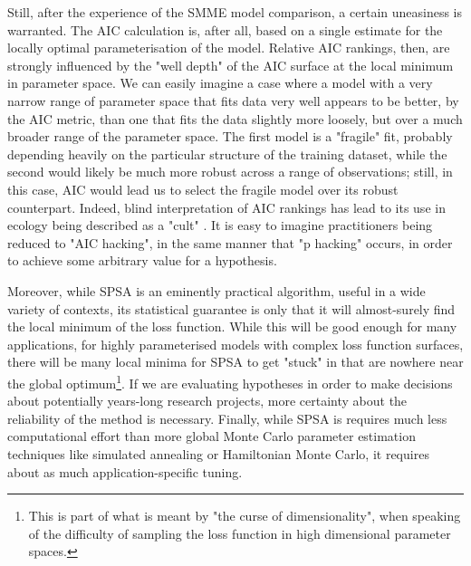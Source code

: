 Still, after the experience of the SMME model comparison, a certain uneasiness is warranted. The AIC calculation is, after all, based on a single estimate for the locally optimal parameterisation of the model. Relative AIC rankings, then, are strongly influenced by the "well depth" of the AIC surface at the local minimum in parameter space. We can easily imagine a case where a model with a very narrow range of parameter space that fits data very well appears to be better, by the AIC metric, than one that fits the data slightly more loosely, but over a much broader range of the parameter space. The first model is a "fragile" fit, probably depending heavily on the particular structure of the training dataset, while the second would likely be much more robust across a range of observations; still, in this case, AIC would lead us to select the fragile model over its robust counterpart. Indeed, blind interpretation of AIC rankings has lead to its use in ecology being described as a "cult" \cite{Brewer2020}. It is easy to imagine practitioners being reduced to "AIC hacking", in the same manner that "p hacking" occurs, in order to achieve some arbitrary value for a hypothesis.

Moreover, while SPSA is an eminently practical algorithm, useful in a wide variety of contexts, its statistical guarantee is only that it will almost-surely find the local minimum of the loss function. While this will be good enough for many applications, for highly parameterised models with complex loss function surfaces, there will be many local minima for SPSA to get "stuck" in that are nowhere near the global optimum\footnote{This is part of what is meant by "the curse of dimensionality", when speaking of the difficulty of sampling the loss function in high dimensional parameter spaces.}. If we are evaluating hypotheses in order to make decisions about potentially years-long research projects, more certainty about the reliability of the method is necessary. Finally, while SPSA is requires much less computational effort than more global Monte Carlo parameter estimation techniques like simulated annealing or Hamiltonian Monte Carlo, it requires about as much application-specific tuning.

